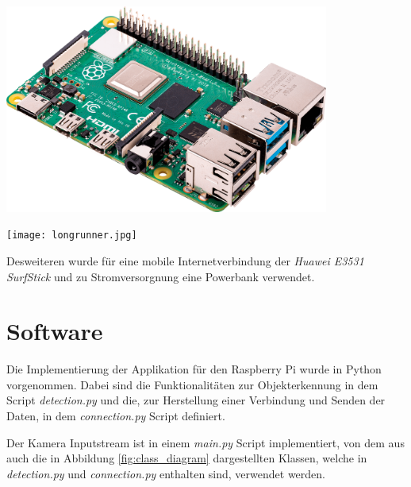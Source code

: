 \vspace{1cm}
\begin{minipage}{0.55\textwidth}
    \centering
    \includegraphics[width=0.8\textwidth]
    {./Bilder/raspberrypi_4.png}
    \label{fig:raspberrypi}
\end{minipage}
\begin{minipage}{0.45\textwidth}
    \centering
    \texttt{[image: longrunner.jpg]}
    \label{fig:rpicam}
\end{minipage}
\vspace{1cm}


Desweiteren wurde für eine mobile Internetverbindung 
der \textit{Huawei E3531 SurfStick} und zu Stromversorgnung
eine Powerbank verwendet.





\section{Software}

Die Implementierung der Applikation für den Raspberry Pi
wurde in Python vorgenommen. 
Dabei sind die Funktionalitäten zur Objekterkennung in
dem Script \textit{detection.py} 
und die, zur Herstellung einer Verbindung
und Senden der Daten, in dem 
\textit{connection.py} Script definiert.


Der Kamera Inputstream ist in einem \textit{main.py} Script 
implementiert, von dem aus auch die in Abbildung 
\ref{fig:class_diagram} 
dargestellten Klassen, welche in \textit{detection.py}
und \textit{connection.py} enthalten sind,
verwendet werden.


